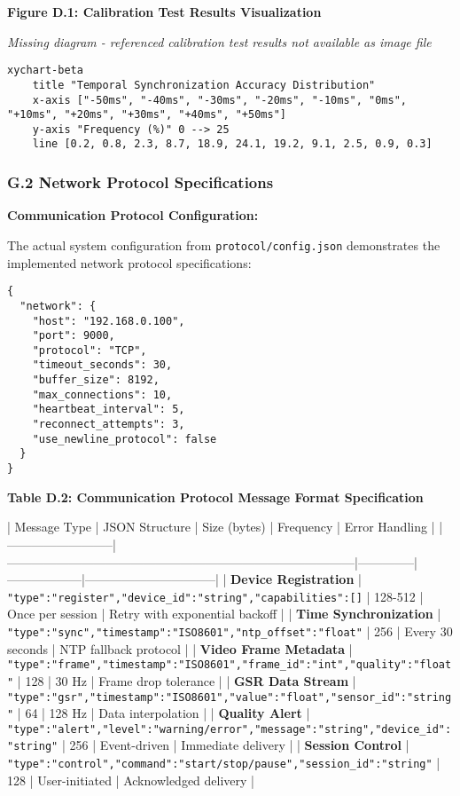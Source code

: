 \documentclass[12pt,a4paper]{article}
\begin{document}
\textbf{Figure D.1: Calibration Test Results Visualization}

\textit{Missing diagram - referenced calibration test results not available as image file}

\begin{verbatim}
xychart-beta
    title "Temporal Synchronization Accuracy Distribution"
    x-axis ["-50ms", "-40ms", "-30ms", "-20ms", "-10ms", "0ms", "+10ms", "+20ms", "+30ms", "+40ms", "+50ms"]
    y-axis "Frequency (%)" 0 --> 25
    line [0.2, 0.8, 2.3, 8.7, 18.9, 24.1, 19.2, 9.1, 2.5, 0.9, 0.3]
\end{verbatim}

\subsubsection{G.2 Network Protocol Specifications}

\textbf{Communication Protocol Configuration:}

The actual system configuration from \texttt{protocol/config.json} demonstrates the implemented network protocol
specifications:

\begin{verbatim}
{
  "network": {
    "host": "192.168.0.100",
    "port": 9000,
    "protocol": "TCP",
    "timeout_seconds": 30,
    "buffer_size": 8192,
    "max_connections": 10,
    "heartbeat_interval": 5,
    "reconnect_attempts": 3,
    "use_newline_protocol": false
  }
}
\end{verbatim}

\textbf{Table D.2: Communication Protocol Message Format Specification}

| Message Type             | JSON Structure                                                                     | Size (bytes) | Frequency        | Error Handling                 |
|--------------------------|------------------------------------------------------------------------------------|--------------|------------------|--------------------------------|
| \textbf{Device Registration}  | \texttt{{"type":"register","device\_id":"string","capabilities":[]}}                       | 128-512      | Once per session | Retry with exponential backoff |
| \textbf{Time Synchronization} | \texttt{{"type":"sync","timestamp":"ISO8601","ntp\_offset":"float"}}                       | 256          | Every 30 seconds | NTP fallback protocol          |
| \textbf{Video Frame Metadata} | \texttt{{"type":"frame","timestamp":"ISO8601","frame\_id":"int","quality":"float"}}        | 128          | 30 Hz            | Frame drop tolerance           |
| \textbf{GSR Data Stream}      | \texttt{{"type":"gsr","timestamp":"ISO8601","value":"float","sensor\_id":"string"}}        | 64           | 128 Hz           | Data interpolation             |
| \textbf{Quality Alert}        | \texttt{{"type":"alert","level":"warning/error","message":"string","device\_id":"string"}} | 256          | Event-driven     | Immediate delivery             |
| \textbf{Session Control}      | \texttt{{"type":"control","command":"start/stop/pause","session\_id":"string"}}            | 128          | User-initiated   | Acknowledged delivery          |
\end{document}
